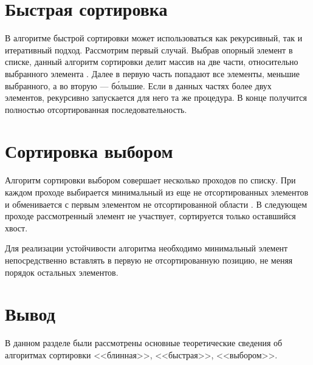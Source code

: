 \section{Быстрая сортировка}
В алгоритме быстрой сортировки может использоваться как рекурсивный, так и итеративный подход. Рассмотрим первый случай. Выбрав опорный элемент в списке, данный алгоритм сортировки делит массив на две части, относительно выбранного элемента \cite{quick_sort}. Далее в первую часть попадают все элементы, меньшие выбранного, а во вторую — б\'ольшие. Если в данных частях более двух элементов, рекурсивно запускается для него та же процедура. В конце получится полностью отсортированная последовательность.

\section{Сортировка выбором}
Алгоритм сортировки выбором совершает несколько проходов по списку. При каждом проходе выбирается минимальный из еще не отсортированных элементов и обменивается с первым элементом не отсортированной области \cite{sort_select}. В следующем проходе рассмотренный элемент не участвует, сортируется только оставшийся хвост.

Для реализации устойчивости алгоритма необходимо минимальный элемент непосредственно вставлять в первую не отсортированную позицию, не меняя порядок остальных элементов.

\section*{Вывод}
В данном разделе были рассмотрены основные теоретические сведения об алгоритмах сортировки <<блинная>>, <<быстрая>>, <<выбором>>. 